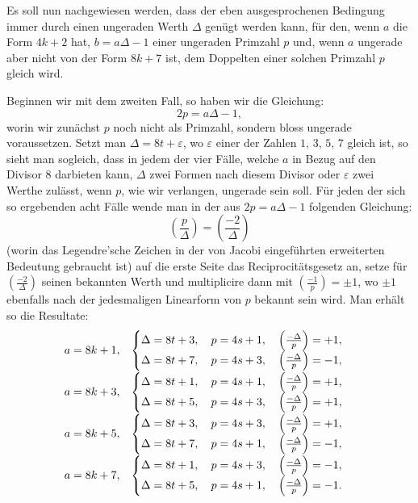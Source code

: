 \documentclass[11pt]{article}
\newcommand{\leg}[2]{\left(\frac{#1}{#2}\right)}
\begin{document}
Es soll nun nachgewiesen werden, dass der eben ausgesprochenen Bedingung immer durch einen ungeraden Werth $\Delta$ genügt werden kann, für den, wenn $a$ die Form $4k+2$ hat, $b=a\Delta-1$ einer ungeraden Primzahl $p$ und, wenn $a$ ungerade aber nicht von der Form $8k+7$ ist, dem Doppelten einer solchen Primzahl $p$ gleich wird.

Beginnen wir mit dem zweiten Fall, so haben wir die Gleichung:
\[
 2p=a\Delta-1,
\]
worin wir zunächst $p$ noch nicht als Primzahl, sondern bloss ungerade voraussetzen. Setzt man $\Delta=8t+\varepsilon$, wo $\varepsilon$ einer der Zahlen $1$, $3$, $5$, $7$ gleich ist, so sieht man sogleich, dass in jedem der vier Fälle, welche $a$ in Bezug auf den Divisor $8$ darbieten kann, $\Delta$ zwei Formen nach diesem Divisor oder $\varepsilon$ zwei Werthe zulässt, wenn $p$, wie wir verlangen, ungerade sein soll. Für jeden der sich so ergebenden acht Fälle wende man in der aus $2p=a\Delta-1$ folgenden Gleichung:
\[
 \leg{p}{\Delta}=\leg{-2}{\Delta}
\]
(worin das Legendre'sche Zeichen in der von Jacobi eingeführten erweiterten Bedeutung gebraucht ist) auf die erste Seite das Reciprocitätsgesetz an, setze für $\leg{-2}{\Delta}$ seinen bekannten Werth und multiplicire dann mit $\leg{-1}{p}=\pm1$, wo $\pm1$ ebenfalls nach der jedesmaligen Linearform von $p$ bekannt sein wird. Man erhält so die Resultate:
\[
\begin{array}{r@{\quad}l}
 a=8k+1, &
 \begin{cases}
 \Delta=8t+3,\quad p=4s+1,\quad \leg{-\Delta}{p}=+1,\\
 \Delta=8t+7,\quad p=4s+3,\quad \leg{-\Delta}{p}=-1,
 \end{cases}\\[1.3em]
 a=8k+3, &
 \begin{cases}
 \Delta=8t+1,\quad p=4s+1,\quad \leg{-\Delta}{p}=+1,\\
 \Delta=8t+5,\quad p=4s+3,\quad \leg{-\Delta}{p}=+1,
 \end{cases}\\[1.3em]
 a=8k+5, &
 \begin{cases}
 \Delta=8t+3,\quad p=4s+3,\quad \leg{-\Delta}{p}=+1,\\
 \Delta=8t+7,\quad p=4s+1,\quad \leg{-\Delta}{p}=-1,
 \end{cases}\\[1.3em]
 a=8k+7, &
 \begin{cases}
 \Delta=8t+1,\quad p=4s+3,\quad \leg{-\Delta}{p}=-1,\\
 \Delta=8t+5,\quad p=4s+1,\quad \leg{-\Delta}{p}=-1.
 \end{cases}
\end{array}
\]
\end{document}
